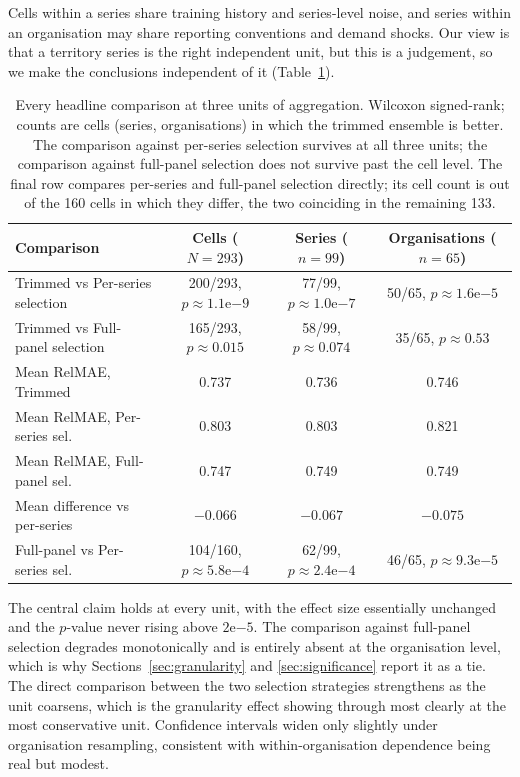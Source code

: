 \documentclass[11pt]{article}
\begin{document}
Cells within a series share training history and series-level noise, and series within an organisation may share reporting conventions and demand shocks. Our view is that a territory series is the right independent unit, but this is a judgement, so we make the conclusions independent of it (Table~\ref{tab:units}).

\begin{table}[htbp]\centering\small
\caption{Every headline comparison at three units of aggregation. Wilcoxon signed-rank; counts are cells (series, organisations) in which the trimmed ensemble is better. The comparison against per-series selection survives at all three units; the comparison against full-panel selection does not survive past the cell level. The final row compares per-series and full-panel selection directly; its cell count is out of the 160 cells in which they differ, the two coinciding in the remaining 133.}
\label{tab:units}
\begin{tabular}{lccc}
\toprule
Comparison & Cells ($N = 293$) & Series ($n = 99$) & Organisations ($n = 65$) \\
\midrule
Trimmed vs Per-series selection & 200/293, $p \approx 1.1\mathrm{e}{-9}$ & 77/99, $p \approx 1.0\mathrm{e}{-7}$ & 50/65, $p \approx 1.6\mathrm{e}{-5}$ \\
Trimmed vs Full-panel selection & 165/293, $p \approx 0.015$ & 58/99, $p \approx 0.074$ & 35/65, $p \approx 0.53$ \\
\midrule
Mean RelMAE, Trimmed & 0.737 & 0.736 & 0.746 \\
Mean RelMAE, Per-series sel. & 0.803 & 0.803 & 0.821 \\
Mean RelMAE, Full-panel sel. & 0.747 & 0.749 & 0.749 \\
Mean difference vs per-series & $-0.066$ & $-0.067$ & $-0.075$ \\
\midrule
Full-panel vs Per-series sel. & 104/160, $p \approx 5.8\mathrm{e}{-4}$ & 62/99, $p \approx 2.4\mathrm{e}{-4}$ & 46/65, $p \approx 9.3\mathrm{e}{-5}$ \\
\bottomrule
\end{tabular}
\end{table}

The central claim holds at every unit, with the effect size essentially unchanged and the $p$-value never rising above $2\mathrm{e}{-5}$. The comparison against full-panel selection degrades monotonically and is entirely absent at the organisation level, which is why Sections~\ref{sec:granularity} and \ref{sec:significance} report it as a tie. The direct comparison between the two selection strategies strengthens as the unit coarsens, which is the granularity effect showing through most clearly at the most conservative unit. Confidence intervals widen only slightly under organisation resampling, consistent with within-organisation dependence being real but modest.
\end{document}
